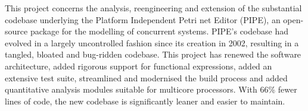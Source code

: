 This project concerns the analysis, reengineering and extension of the
substantial codebase underlying the Platform Independent Petri net
Editor (PIPE), an open-source package for the modelling of concurrent
systems. PIPE's codebase had evolved in a largely uncontrolled fashion
since its creation in 2002, resulting in a tangled, bloated and
bug-ridden codebase. This project has renewed the software
architecture, added rigorous support for functional expressions, added
an extensive test suite, streamlined and modernised the build process
and added quantitative analysis modules suitable for multicore
processors.  With 66\% fewer lines of code, the new codebase is
significantly leaner and easier to maintain.
